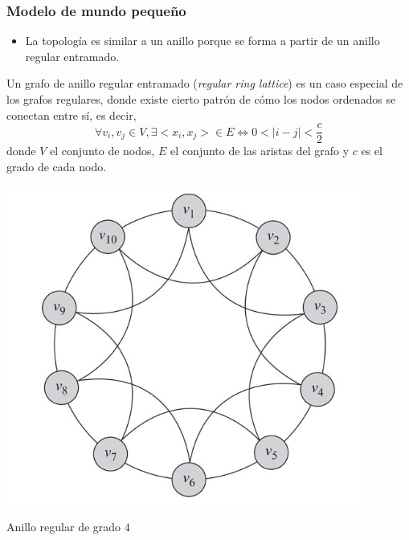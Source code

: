 \documentclass[
10pt, %
aspectratio=169, %
]{beamer}
\begin{document}
	\begin{frame}
		
		\frametitle{Modelo de mundo pequeño}
		
		\begin{itemize}
			\item La topología es similar a un anillo porque se forma a partir de un anillo regular entramado. \\[2mm]
		\end{itemize}
			
			\begin{minipage}{0.45\textwidth}
				
				\begin{alertblock}{}
					Un grafo de anillo regular entramado (\emph{regular ring lattice}) es un caso especial de los grafos regulares, donde existe cierto patrón de cómo los nodos ordenados se conectan entre sí, es decir, 
					$$\forall v_i, v_j \in V, \exists <x_i, x_j> \in E \Leftrightarrow 0 < |i - j| < \frac{c}{2}$$ 
					donde $V$ el conjunto de nodos, $E$ el conjunto de las aristas del grafo y $c$ es el grado de cada nodo.
				\end{alertblock}
				
			\end{minipage}%
			\hfill
			\begin{minipage}{0.45\textwidth}
				
				\centering
				\includegraphics[scale=0.35]{anillo-regular.png}
				
				Anillo regular de grado $4$
			\end{minipage}%
			
	\end{frame}
	
\end{document}
